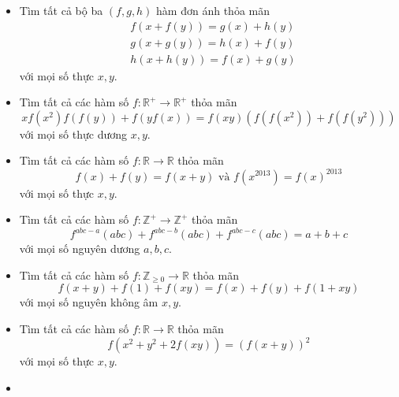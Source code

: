 \documentclass[11pt]{scrartcl}
\begin{document}
\begin{itemize}[label=, leftmargin=0em, itemsep=-0em]
\begin{btvn}
    \end{btvn}
    \item \begin{btvn}
        Tìm tất cả bộ ba $(f,g,h)$ hàm đơn ánh thỏa mãn 
        \[
           \begin{aligned}
            &f(x + f(y)) = g(x) + h(y)\\
            &g(x + g(y)) = h(x) + f(y) \\
            &h(x + h(y)) = f(x) + g(y)
           \end{aligned}
        \]
        với mọi số thực $x,y$.
    \end{btvn}
    \item \begin{btvn}
        Tìm tất cả các hàm số $f: \mathbb{R}^+ \to \mathbb{R}^+$ thỏa mãn
        \[
           xf(x^2)f(f(y)) + f(yf(x)) = f(xy)\left(f(f(x^2)) + f(f(y^2))\right)
        \]
        với mọi số thực dương $x,y$.
    \end{btvn}
    \item \begin{btvn}
        Tìm tất cả các hàm số $f: \mathbb{R} \to \mathbb{R}$ thỏa mãn
        \[
           f(x) + f(y) = f(x + y) \text{ và }f(x^{2013}) = f(x)^{2013}
        \]
        với mọi số thực $x,y$.
    \end{btvn}
    \item \begin{btvn}
        Tìm tất cả các hàm số $f: \mathbb{Z}^+ \to \mathbb{Z}^+$ thỏa mãn
        \[
           f^{abc - a}(abc) + f^{abc - b}(abc) + f^{abc - c}(abc) = a + b + c
        \]
        với mọi số nguyên dương $a,b,c$.
    \end{btvn}
    \item \begin{btvn}
        Tìm tất cả các hàm số $f: \mathbb{Z}_{\geq 0} \to \mathbb{R}$ thỏa mãn
        \[
           f(x + y) + f(1) + f(xy) = f(x) + f(y) + f(1 + xy)
        \]
        với mọi số nguyên không âm $x,y$.
    \end{btvn}
    \item \begin{btvn}
        Tìm tất cả các hàm số $f: \mathbb{R} \to \mathbb{R}$ thỏa mãn
        \[
           f(x^2 + y^2 +2f(xy)) = \left(f(x + y)\right)^2
        \]
        với mọi số thực $x,y$.
    \end{btvn}
    \item \begin{btvn}

\end{btvn}
\end{itemize}
\end{document}
